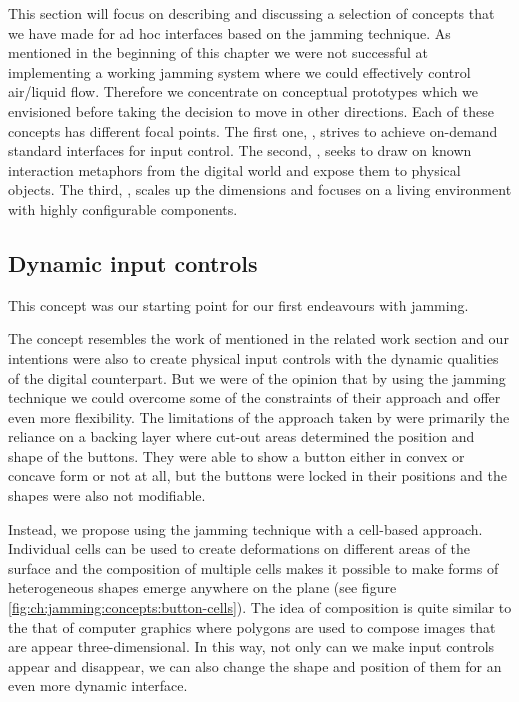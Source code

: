 This section will focus on describing and discussing a selection of concepts that we have made for ad hoc interfaces based on the jamming technique.
As mentioned in the beginning of this chapter we were not successful at implementing a working jamming system where we could effectively control air/liquid flow.
Therefore we concentrate on conceptual prototypes which we envisioned before taking the decision to move in other directions.
Each of these concepts has different focal points.
The first one, \emph{}, strives to achieve on-demand standard interfaces for input control.
The second, \emph{}, seeks to draw on known interaction metaphors from the digital world and expose them to physical objects.
The third, \emph{}, scales up the dimensions and focuses on a living environment with highly configurable components.

\subsection{Dynamic input controls} 
\label{ch:jamming:concepts:dynamic_input}

This concept was our starting point for our first endeavours with jamming.

The concept resembles the work of \citet{harrison2009providing} mentioned in the related work section and our intentions were also to create physical input controls with the dynamic qualities of the digital counterpart.
But we were of the opinion that by using the jamming technique we could overcome some of the constraints of their approach and offer even more flexibility.
The limitations of the approach taken by \citet{harrison2009providing} were primarily the reliance on a backing layer where cut-out areas determined the position and shape of the buttons.
They were able to show a button either in convex or concave form or not at all, but the buttons were locked in their positions and the shapes were also not modifiable.

Instead, we propose using the jamming technique with a cell-based approach.
Individual cells can be used to create deformations on different areas of the surface and the composition of multiple cells makes it possible to make forms of heterogeneous shapes emerge anywhere on the plane (see figure \ref{fig:ch:jamming:concepts:button-cells}).
The idea of composition is quite similar to the that of computer graphics where polygons are used to compose images that are appear three-dimensional.
In this way, not only can we make input controls appear and disappear, we can also change the shape and position of them for an even more dynamic interface.

